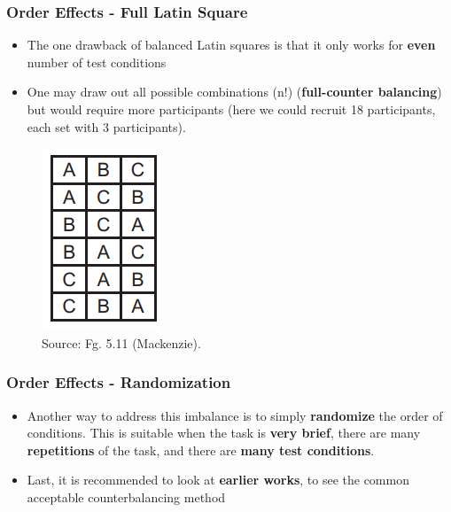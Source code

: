 \documentclass{beamer}
\begin{document}

\begin{frame}
\frametitle{Order Effects - Full Latin Square}
\begin{itemize}
\item The one drawback of balanced Latin squares is that it only works for \textbf{even} number of test conditions
\item One may draw out all possible combinations (n!) (\textbf{full-counter balancing}) but would require more participants (here we could recruit 18 participants, each set with 3 participants).  %
\end{itemize}
\begin{figure}
\includegraphics[width=0.2\linewidth]{full}
\caption{Source: Fg. 5.11 (Mackenzie).}
\end{figure}
\end{frame}

\begin{frame}
\frametitle{Order Effects - Randomization}
\begin{itemize}
\item Another way to address this imbalance is to simply \textbf{randomize} the order of conditions.  This is suitable when the task is \textbf{very brief}, there are many \textbf{repetitions} of the task, and there are \textbf{many test conditions}.  %
\item Last, it is recommended to look at \textbf{earlier works}, to see the common acceptable counterbalancing method  %
\end{itemize}
\end{frame}
\end{document}
